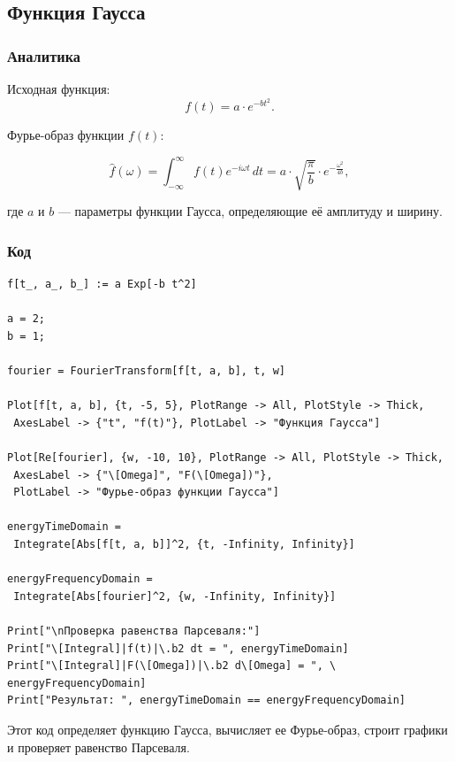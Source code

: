 \documentclass[a4paper,12pt]{article}
\begin{document}
\subsection{Функция Гаусса}
\subsubsection{Аналитика}
Исходная функция:
\[
f(t) = a \cdot e^{-b t^2}.
\]

Фурье-образ функции \( f(t) \):

\[
\hat{f}(\omega) = \int_{-\infty}^{\infty} f(t) e^{-i \omega t} \, dt = a \cdot \sqrt{\frac{\pi}{b}} \cdot e^{-\frac{\omega^2}{4b}},
\]

где \( a \) и \( b \) — параметры функции Гаусса, определяющие её амплитуду и ширину.


\subsubsection{Код}
\begin{lstlisting}[caption=Фурье-образ Гауссовой функции и проверка равенства Парсеваля]
f[t_, a_, b_] := a Exp[-b t^2]

a = 2;
b = 1;

fourier = FourierTransform[f[t, a, b], t, w]

Plot[f[t, a, b], {t, -5, 5}, PlotRange -> All, PlotStyle -> Thick, 
 AxesLabel -> {"t", "f(t)"}, PlotLabel -> "Функция Гаусса"]

Plot[Re[fourier], {w, -10, 10}, PlotRange -> All, PlotStyle -> Thick, 
 AxesLabel -> {"\[Omega]", "F(\[Omega])"}, 
 PlotLabel -> "Фурье-образ функции Гаусса"]

energyTimeDomain = 
 Integrate[Abs[f[t, a, b]]^2, {t, -Infinity, Infinity}]

energyFrequencyDomain = 
 Integrate[Abs[fourier]^2, {w, -Infinity, Infinity}]

Print["\nПроверка равенства Парсеваля:"]
Print["\[Integral]|f(t)|\.b2 dt = ", energyTimeDomain]
Print["\[Integral]|F(\[Omega])|\.b2 d\[Omega] = ", \
energyFrequencyDomain]
Print["Результат: ", energyTimeDomain == energyFrequencyDomain]
\end{lstlisting}
Этот код определяет функцию Гаусса, вычисляет ее Фурье-образ, строит графики и проверяет равенство Парсеваля.
\end{document}
